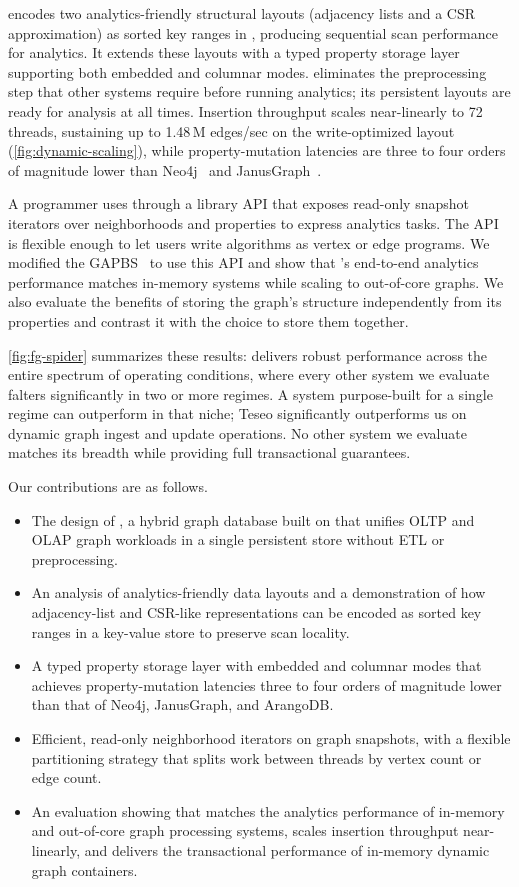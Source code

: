 \project{} encodes two analytics-friendly structural layouts (adjacency lists and a CSR approximation) as sorted key ranges in \wt{}, producing sequential scan performance for analytics.
It extends these layouts with a typed property storage layer supporting both embedded and columnar modes.
\project{} eliminates the preprocessing step that other systems require before running analytics; its persistent layouts are ready for analysis at all times.
Insertion throughput scales near-linearly to 72 threads, sustaining up to 1.48\,M edges/sec on the write-optimized layout (\autoref{fig:dynamic-scaling}), while property-mutation latencies are three to four orders of magnitude lower than Neo4j~\cite{neo4j} and JanusGraph~\cite{janusgraph}.

A programmer uses \project{} through a library API that exposes read-only snapshot iterators over neighborhoods and properties to express analytics tasks.
The API is flexible enough to let users write algorithms as vertex or edge programs.
We modified the \ac{GAPBS}~\cite{beamer2015gap} to use this API and show that \project{}'s end-to-end analytics performance matches in-memory systems while scaling to out-of-core graphs.
We also evaluate the benefits of storing the graph's structure independently from its properties and contrast it with the choice to store them together.

\autoref{fig:fg-spider} summarizes these results: \project{} delivers robust performance across the entire spectrum of operating conditions, where every other system we evaluate falters significantly in two or more regimes.
A system purpose-built for a single regime can outperform \project{} in that niche; Teseo significantly outperforms us on dynamic graph ingest and update operations.
No other system we evaluate matches its breadth while providing full transactional guarantees.

Our contributions are as follows.
\begin{itemize}
  \item The design of \project{}, a hybrid graph database built on \wt{} that unifies OLTP and OLAP graph workloads in a single persistent store without ETL or preprocessing.
  \item An analysis of analytics-friendly data layouts and a demonstration of how adjacency-list and CSR-like representations can be encoded as sorted key ranges in a key-value store to preserve scan locality.
  \item A typed property storage layer with embedded and columnar modes that achieves property-mutation latencies three to four orders of magnitude lower than that of Neo4j, JanusGraph, and ArangoDB.
  \item Efficient, read-only neighborhood iterators on graph snapshots, with a flexible partitioning strategy that splits work between threads by vertex count or edge count.
  \item An evaluation showing that \project{} matches the analytics performance of in-memory and out-of-core graph processing systems, scales insertion throughput near-linearly, and delivers the transactional performance of in-memory dynamic graph containers.
\end{itemize}

